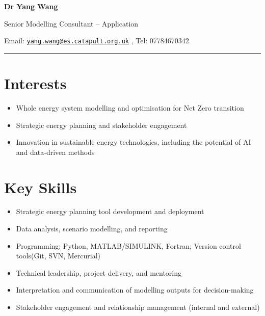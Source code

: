 \documentclass[letterpaper]{article}
\def\name{Dr Yang Wang}
\begin{document}

\centerline{\LARGE \bf Dr Yang Wang}
\vspace{0.05in}
\centerline{\large Senior Modelling Consultant – Application}

\begin{minipage}{\linewidth}
\begin{center}
Email: \href{mailto:yang.wang@es.catapult.org.uk}{\tt yang.wang@es.catapult.org.uk} , Tel: 07784670342 \\
\end{center}
\end{minipage}

\rule{\textwidth}{1pt}

\section*{Interests}
\begin{itemize}
\item Whole energy system modelling and optimisation for Net Zero transition
\item Strategic energy planning and stakeholder engagement
\item Innovation in sustainable energy technologies, including the potential of AI and data-driven methods
\end{itemize}

\section*{Key Skills}
\begin{itemize}
\item Strategic energy planning tool development and deployment
\item Data analysis, scenario modelling, and reporting
\item Programming: Python, MATLAB/SIMULINK, Fortran; Version control tools(Git, SVN, Mercurial)
\item Technical leadership, project delivery, and mentoring
\item Interpretation and communication of modelling outputs for decision-making
\item Stakeholder engagement and relationship management (internal and external)
\end{itemize}
\end{document}
